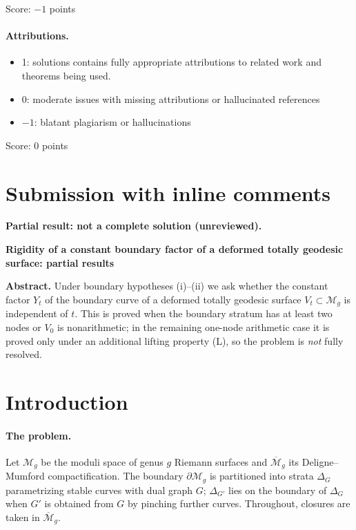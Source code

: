 \documentclass[11pt]{article}
\newcommand{\M}{\mathcal M}
\newcommand{\cl}[1]{\overline{#1}}
\theoremstyle{remark}
\begin{document}
\noindent Score: $-1$ points

\paragraph{Attributions.}
\begin{itemize}
	\item  1: solutions contains fully appropriate attributions
		to related work and theorems being used.
	\item  0: moderate issues with missing attributions or hallucinated references
	\item  $-1$: blatant plagiarism or hallucinations
\end{itemize}

\noindent Score: $0$ points

\newpage
\section{Submission with inline comments}


\noindent\textbf{Partial result: not a complete solution (unreviewed).}\par

\begin{center}
\textbf{Rigidity of a constant boundary factor of a deformed
totally geodesic surface: partial results}
\end{center}

\noindent\textbf{Abstract.}
Under boundary hypotheses (i)--(ii) we ask whether the constant
factor \(Y_t\) of the boundary curve of a deformed totally geodesic
surface \(V_t\subset\M_g\) is independent of \(t\). This is proved
when the boundary stratum has at least two nodes or \(V_0\) is
nonarithmetic; in the remaining one-node arithmetic case
it is proved only under an additional lifting property (L), so the
problem is \emph{not} fully resolved.

\section{Introduction}

\paragraph{The problem.}
Let \(\M_g\) be the moduli space of genus \(g\) Riemann surfaces and
\(\cl{\M}_g\) its Deligne--Mumford compactification. The boundary
\(\partial\M_g\) is partitioned into strata \(\Delta_G\) parametrizing
stable curves with dual graph \(G\); \(\Delta_{G'}\) lies
on the boundary of \(\Delta_G\) when \(G'\) is obtained from \(G\) by
pinching further curves. Throughout, closures are taken in \(\cl{\M}_g\).
\end{document}

